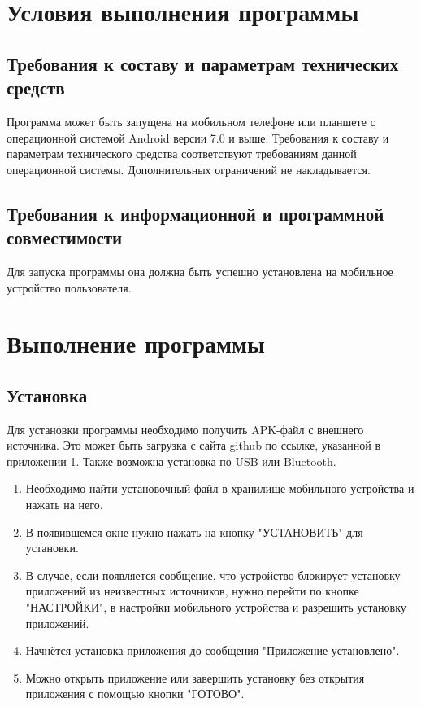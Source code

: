 \documentclass[draft]{article}
\begin{document}
\section{Условия выполнения программы}
\subsection{Требования к составу и параметрам технических средств}
Программа может быть запущена на мобильном телефоне или планшете с операционной системой Android версии 7.0 и выше. Требования к составу и параметрам технического средства соответствуют требованиям данной операционной системы. Дополнительных ограничений не накладывается.
\subsection{Требования к информационной и программной совместимости}
Для запуска программы она должна быть успешно установлена на мобильное устройство пользователя.
\newpage
\section{Выполнение программы}
\subsection{Установка}
Для установки программы необходимо получить APK-файл с внешнего источника. Это может быть загрузка с сайта github по ссылке, указанной в приложении 1. Также возможна установка по USB или Bluetooth.
\begin{enumerate}
\item Необходимо найти установочный файл в хранилище мобильного устройства и нажать на него.
\item В появившемся окне нужно нажать на кнопку "{}УСТАНОВИТЬ"{} для установки.
\item В случае, если появляется сообщение, что устройство блокирует установку приложений из неизвестных источников, нужно перейти по кнопке "{}НАСТРОЙКИ"{}, в настройки мобильного устройства и разрешить установку приложений.
\item Начнётся установка приложения до сообщения "Приложение установлено".
\item Можно открыть приложение или завершить установку без открытия приложения с помощью кнопки "{}ГОТОВО"{}.
\end{enumerate}
\end{document}
